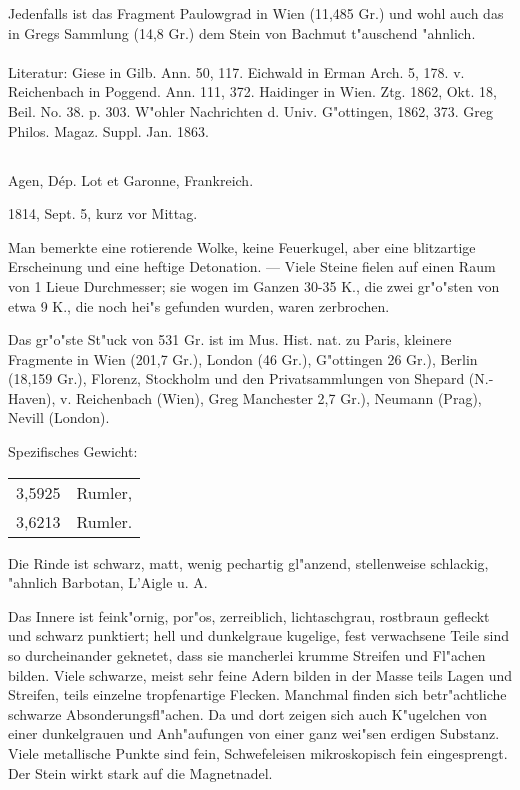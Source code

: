 \documentclass[a4paper, 11pt, oneside]{article}
\begin{document}
Jedenfalls ist das Fragment Paulowgrad in Wien (11,485 Gr.) und wohl auch das in Gregs Sammlung (14,8 Gr.) dem Stein von Bachmut t"auschend "ahnlich.
\normalsize
\paragraph{}
Literatur: Giese in Gilb. Ann. 50, 117. Eichwald in Erman Arch. 5, 178. v. Reichenbach in Poggend. Ann. 111, 372. Haidinger in Wien. Ztg. 1862, Okt. 18, Beil. No. 38. p. 303. W"ohler Nachrichten d. Univ. G"ottingen, 1862, 373. Greg Philos. Magaz. Suppl. Jan. 1863.
\subsection{}
\LARGE
\paragraph{}
Agen, Dép. Lot et Garonne, Frankreich.

1814, Sept. 5, kurz vor Mittag.

Man bemerkte eine rotierende Wolke, keine Feuerkugel, aber eine blitzartige Erscheinung und eine heftige Detonation. --- Viele Steine fielen auf einen Raum von 1 Lieue Durchmesser; sie wogen im Ganzen 30-35 K., die zwei gr"o"sten von etwa 9 K., die noch hei"s gefunden wurden, waren zerbrochen.

Das gr"o"ste St"uck von 531 Gr. ist im Mus. Hist. nat. zu Paris, kleinere Fragmente in Wien (201,7 Gr.), London (46 Gr.), G"ottingen 26 Gr.), Berlin (18,159 Gr.), Florenz, Stockholm und den Privatsammlungen von Shepard (N.-Haven), v. Reichenbach (Wien), Greg Manchester 2,7 Gr.), Neumann (Prag), Nevill (London).

Spezifisches Gewicht:
\begin{table}[!ht]
    \centering\swabfamily\Large
    \begin{tabular}{l l}
        3,5925 & Rumler,\\
        3,6213 & Rumler.
    \end{tabular}
\end{table}

Die Rinde ist schwarz, matt, wenig pechartig gl"anzend, stellenweise schlackig, "ahnlich Barbotan, L'Aigle u. A.

Das Innere ist feink"ornig, por"os, zerreiblich, lichtaschgrau, rostbraun gefleckt und schwarz punktiert; hell und dunkelgraue kugelige, fest verwachsene Teile sind so durcheinander geknetet, dass sie mancherlei krumme Streifen und Fl"achen bilden. Viele schwarze, meist sehr feine Adern bilden in der Masse teils Lagen und Streifen, teils einzelne tropfenartige Flecken. Manchmal finden sich betr"achtliche schwarze Absonderungsfl"achen. Da und dort zeigen sich auch K"ugelchen von einer dunkelgrauen und Anh"aufungen von einer ganz wei"sen erdigen Substanz. Viele metallische Punkte sind fein, Schwefeleisen mikroskopisch fein eingesprengt. Der Stein wirkt stark auf die Magnetnadel.
\end{document}
